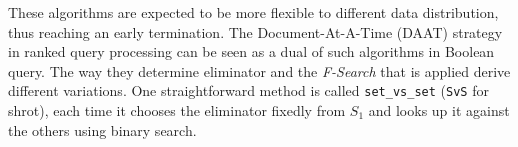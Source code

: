 %
These algorithms are expected to be more flexible to different data distribution, thus reaching an early termination.
The Document-At-A-Time (DAAT) strategy in ranked query processing can be seen as a dual of such algorithms in Boolean query.
The way they determine eliminator and the \textit{F-Search} that is applied derive different variations.
One straightforward method is called \texttt{set\_vs\_set} (\texttt{SvS} for shrot), each time it chooses the eliminator fixedly from $ S_1 $ and looks up it against the others using binary search.
